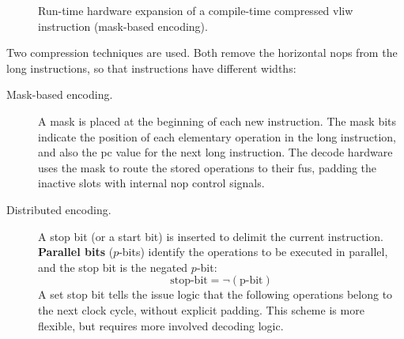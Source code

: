 \begin{figure}[htpb]
\centering
{}
\caption{Run-time hardware expansion of a compile-time compressed \gls{vliw} instruction (mask-based encoding).}
\label{fig:vliw_compression_expansion}
\end{figure}

Two compression techniques are used. Both remove the horizontal \glspl{nop} from the long instructions, so that instructions have different widths:

\begin{description}
    \item[Mask-based encoding.] A mask is placed at the beginning of each new instruction. The mask bits indicate the position of each elementary operation in the long instruction, and also the \gls{pc} value for the next long instruction. The decode hardware uses the mask to route the stored operations to their \glspl{fu}, padding the inactive slots with internal \gls{nop} control signals.
    \item[Distributed encoding.] A stop bit (or a start bit) is inserted to delimit the current instruction. \textbf{Parallel bits} ($p$-bits) identify the operations to be executed in parallel, and the stop bit is the negated $p$-bit:
    \begin{equation}
        \text{stop-bit} = \neg (\text{p-bit})
    \end{equation}
    A set stop bit tells the issue logic that the following operations belong to the next clock cycle, without explicit padding. This scheme is more flexible, but requires more involved decoding logic.
\end{description}

